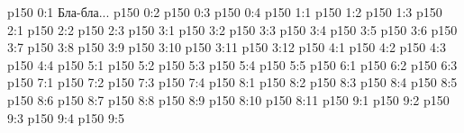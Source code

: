 \author{Промежуточные создания}
\vs p150 0:1  Бла-бла...
\vs p150 0:2 
\vs p150 0:3 \pc 
\vs p150 0:4 
\vs p150 1:1 
\vs p150 1:2 
\vs p150 1:3 
\vs p150 2:1 
\vs p150 2:2 
\vs p150 2:3 
\vs p150 3:1 
\vs p150 3:2 \pc 
\vs p150 3:3 
\vs p150 3:4 
\vs p150 3:5 
\vs p150 3:6 
\vs p150 3:7 
\vs p150 3:8 
\vs p150 3:9 
\vs p150 3:10 
\vs p150 3:11 
\vs p150 3:12 
\vs p150 4:1 
\vs p150 4:2 
\vs p150 4:3 
\vs p150 4:4 
\vs p150 5:1 
\vs p150 5:2 \pc 
\vs p150 5:3 
\vs p150 5:4 \pc 
\vs p150 5:5 
\vs p150 6:1 
\vs p150 6:2 
\vs p150 6:3 
\vs p150 7:1 
\vs p150 7:2 
\vs p150 7:3 
\vs p150 7:4 
\vs p150 8:1 
\vs p150 8:2 
\vs p150 8:3 
\vs p150 8:4 
\vs p150 8:5 
\vs p150 8:6 
\vs p150 8:7 
\vs p150 8:8 
\vs p150 8:9 
\vs p150 8:10 
\vs p150 8:11 
\vs p150 9:1 
\vs p150 9:2 
\vs p150 9:3 
\vs p150 9:4 
\vs p150 9:5 
\quizlink

